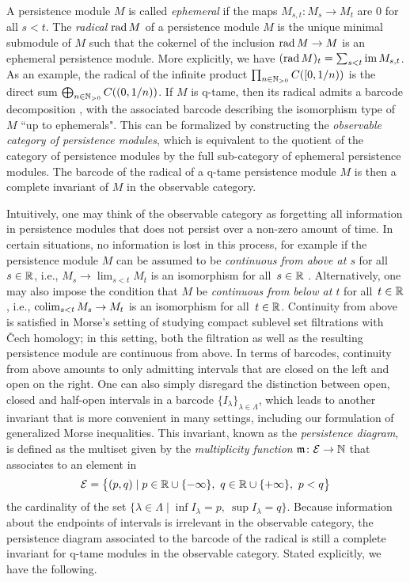A persistence module $M$ is called \emph{ephemeral} if the maps $M_{s,t} \colon M_s \to M_t$ are $0$ for all $s < t$.
The \emph{radical} $\operatorname{rad} M$ of a persistence module $M$ is the unique minimal submodule of $M$ such that the cokernel of the inclusion $\operatorname{rad} M \to M$ is an ephemeral persistence module.
More explicitly, we have $(\operatorname{rad} M)_t = \sum_{s<t}\operatorname{im} M_{s,t}$.
As an example, the radical of the infinite product $\prod_{n \in \mathbb{N}_{> 0}} C([0,1/n))$ is the direct sum $\bigoplus_{n \in \mathbb{N}_{> 0}} C((0,1/n))$.
If $M$ is q-tame, then its radical admits a barcode decomposition \cite[Corollary~3.6]{Chazal.2016b},
with the associated barcode describing the isomorphism type of~$M$ ``up to ephemerals".
This can be formalized by constructing the \emph{observable category of persistence modules}, which is equivalent to the quotient of the category of persistence modules by the full sub-category of ephemeral persistence modules.
The barcode of the radical of a q-tame persistence module $M$ is then a complete invariant of $M$ in the observable category.

Intuitively, one may think of the observable category as forgetting all information in persistence modules that does not persist over a non-zero amount of time.
In certain situations, no information is lost in this process, for example if the persistence module $M$ can be assumed to be \emph{continuous from above at $s$} for all~$s \in \mathbb{R}$, i.e., $M_{s} \to \lim_{s < t} M_{t}$ is an isomorphism for all~$s \in \mathbb{R}$ \cite{Schmahl.2021}.
Alternatively, one may also impose the condition that $M$ be \emph{continuous from below at $t$} for all~$t \in \mathbb{R}$, i.e., $\operatorname*{colim}_{s < t} M_{s} \to M_{t}$ is an isomorphism for all~$t \in \mathbb{R}$.
Continuity from above is satisfied in Morse's setting of studying compact sublevel set filtrations with \v{C}ech homology; in this setting, both the filtration as well as the resulting persistence module are continuous from above.
In terms of barcodes, continuity from above amounts to only admitting intervals that are closed on the left and open on the right.
One can also simply disregard the distinction between open, closed and half-open intervals in a barcode $\{I_{\lambda}\}_{\lambda \in \Lambda}$, which leads to another invariant that is more convenient in many settings, including our formulation of generalized Morse inequalities.
This invariant, known as the \emph{persistence diagram}, is defined as the multiset given by the \emph{multiplicity function} $\mathfrak{m} \colon \mathcal{E} \to \mathbb{N}$ that associates to an element in
\begin{equation*}
\mathcal{E} =
\big\{ (p,q) \mid p \in \mathbb{R} \cup \{-\infty\}, \ q \in \mathbb{R} \cup \{+\infty\}, \ p < q \big\}
\end{equation*}
the cardinality of the set $\{ \lambda \in \Lambda \mid \inf I_{\lambda} = p,\ \sup I_{\lambda} = q\}$.
Because information about the endpoints of intervals is irrelevant in the observable category, the persistence diagram associated to the barcode of the radical is still a complete invariant for q-tame modules in the observable category.
Stated explicitly, we have the following.

